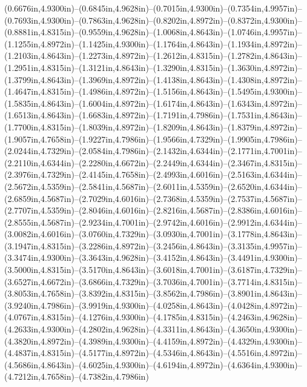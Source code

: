 (0.6676in,4.9300in)--(0.6845in,4.9628in)--(0.7015in,4.9300in)--(0.7354in,4.9957in)--(0.7693in,4.9300in)--(0.7863in,4.9628in)--(0.8202in,4.8972in)--(0.8372in,4.9300in)--(0.8881in,4.8315in)--(0.9559in,4.9628in)--(1.0068in,4.8643in)--(1.0746in,4.9957in)--(1.1255in,4.8972in)--(1.1425in,4.9300in)--(1.1764in,4.8643in)--(1.1934in,4.8972in)--(1.2103in,4.8643in)--(1.2273in,4.8972in)--(1.2612in,4.8315in)--(1.2782in,4.8643in)--(1.2951in,4.8315in)--(1.3121in,4.8643in)--(1.3290in,4.8315in)--(1.3630in,4.8972in)--(1.3799in,4.8643in)--(1.3969in,4.8972in)--(1.4138in,4.8643in)--(1.4308in,4.8972in)--(1.4647in,4.8315in)--(1.4986in,4.8972in)--(1.5156in,4.8643in)--(1.5495in,4.9300in)--(1.5835in,4.8643in)--(1.6004in,4.8972in)--(1.6174in,4.8643in)--(1.6343in,4.8972in)--(1.6513in,4.8643in)--(1.6683in,4.8972in)--(1.7191in,4.7986in)--(1.7531in,4.8643in)--(1.7700in,4.8315in)--(1.8039in,4.8972in)--(1.8209in,4.8643in)--(1.8379in,4.8972in)--(1.9057in,4.7658in)--(1.9227in,4.7986in)--(1.9566in,4.7329in)--(1.9905in,4.7986in)--(2.0244in,4.7329in)--(2.0584in,4.7986in)--(2.1432in,4.6344in)--(2.1771in,4.7001in)--(2.2110in,4.6344in)--(2.2280in,4.6672in)--(2.2449in,4.6344in)--(2.3467in,4.8315in)--(2.3976in,4.7329in)--(2.4145in,4.7658in)--(2.4993in,4.6016in)--(2.5163in,4.6344in)--(2.5672in,4.5359in)--(2.5841in,4.5687in)--(2.6011in,4.5359in)--(2.6520in,4.6344in)--(2.6859in,4.5687in)--(2.7029in,4.6016in)--(2.7368in,4.5359in)--(2.7537in,4.5687in)--(2.7707in,4.5359in)--(2.8046in,4.6016in)--(2.8216in,4.5687in)--(2.8386in,4.6016in)--(2.8555in,4.5687in)--(2.9234in,4.7001in)--(2.9742in,4.6016in)--(2.9912in,4.6344in)--(3.0082in,4.6016in)--(3.0760in,4.7329in)--(3.0930in,4.7001in)--(3.1778in,4.8643in)--(3.1947in,4.8315in)--(3.2286in,4.8972in)--(3.2456in,4.8643in)--(3.3135in,4.9957in)--(3.3474in,4.9300in)--(3.3643in,4.9628in)--(3.4152in,4.8643in)--(3.4491in,4.9300in)--(3.5000in,4.8315in)--(3.5170in,4.8643in)--(3.6018in,4.7001in)--(3.6187in,4.7329in)--(3.6527in,4.6672in)--(3.6866in,4.7329in)--(3.7036in,4.7001in)--(3.7714in,4.8315in)--(3.8053in,4.7658in)--(3.8392in,4.8315in)--(3.8562in,4.7986in)--(3.8901in,4.8643in)--(3.9240in,4.7986in)--(3.9919in,4.9300in)--(4.0258in,4.8643in)--(4.0428in,4.8972in)--(4.0767in,4.8315in)--(4.1276in,4.9300in)--(4.1785in,4.8315in)--(4.2463in,4.9628in)--(4.2633in,4.9300in)--(4.2802in,4.9628in)--(4.3311in,4.8643in)--(4.3650in,4.9300in)--(4.3820in,4.8972in)--(4.3989in,4.9300in)--(4.4159in,4.8972in)--(4.4329in,4.9300in)--(4.4837in,4.8315in)--(4.5177in,4.8972in)--(4.5346in,4.8643in)--(4.5516in,4.8972in)--(4.5686in,4.8643in)--(4.6025in,4.9300in)--(4.6194in,4.8972in)--(4.6364in,4.9300in)--(4.7212in,4.7658in)--(4.7382in,4.7986in) 